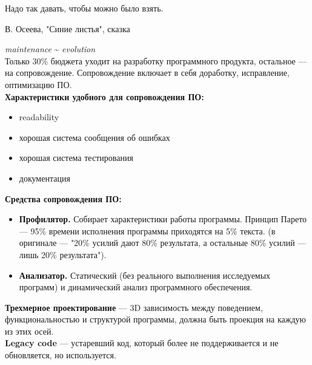 \documentclass[12pt, a4paper]{article}
\begin{document}
\epigraph{Надо так давать, чтобы можно было взять.}{В. Осеева, "Синие листья"{}, сказка}

\textit{maintenance} \sim{} \textit{evolution}\\

Только 30\% бюджета уходит на разработку программного продукта, остальное --- на сопровождение.
Сопровождение включает в себя доработку, исправление, оптимизацию ПО.\\

\textbf{Характеристики удобного для сопровождения ПО:}

\begin{itemize}
    \item readability
    \item хорошая система сообщения об ошибках
    \item хорошая система тестирования
    \item документация
\end{itemize}

\textbf{Средства сопровождения ПО:}

\begin{itemize}
    \item \textbf{Профилятор.} Собирает характеристики работы программы. Принцип Парето --- 95\% времени исполнения программы приходятся на 5\% текста. (в оригинале --- "20\% усилий дают 80\% результата, а остальные 80\% усилий — лишь 20\% результата"{}).
    \item \textbf{Анализатор.}  Статический (без реального выполнения исследуемых программ) и динамический анализ программного обеспечения.
\end{itemize}

\textbf{Трехмерное проектирование} --- 3D зависимость между поведением, функциональностью и структурой программы, должна быть проекция на каждую из этих осей.\\

\textbf{Legacy code} --- устаревший код, который более не поддерживается и не обновляется, но используется.\\
\end{document}
